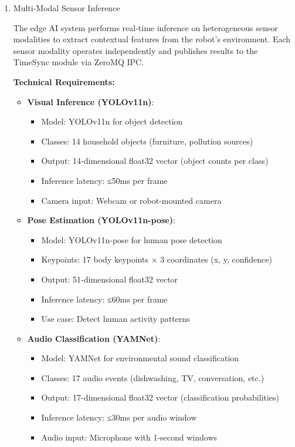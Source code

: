 \documentclass[conference]{IEEEtran}
\begin{document}
\begin{enumerate}
    \item[1.] Multi-Modal Sensor Inference

The edge AI system performs real-time inference on heterogeneous sensor modalities to extract contextual features from the robot's environment. Each sensor modality operates independently and publishes results to the TimeSync module via ZeroMQ IPC.

\textbf{Technical Requirements:}
\begin{itemize}
    \item \textbf{Visual Inference (YOLOv11n)}:
    \begin{itemize}
        \item Model: YOLOv11n for object detection
        \item Classes: 14 household objects (furniture, pollution sources)
        \item Output: 14-dimensional float32 vector (object counts per class)
        \item Inference latency: ≤50ms per frame
        \item Camera input: Webcam or robot-mounted camera
    \end{itemize}
    \item \textbf{Pose Estimation (YOLOv11n-pose)}:
    \begin{itemize}
        \item Model: YOLOv11n-pose for human pose detection
        \item Keypoints: 17 body keypoints × 3 coordinates (x, y, confidence)
        \item Output: 51-dimensional float32 vector
        \item Inference latency: ≤60ms per frame
        \item Use case: Detect human activity patterns
    \end{itemize}
    \item \textbf{Audio Classification (YAMNet)}:
    \begin{itemize}
        \item Model: YAMNet for environmental sound classification
        \item Classes: 17 audio events (dishwashing, TV, conversation, etc.)
        \item Output: 17-dimensional float32 vector (classification probabilities)
        \item Inference latency: ≤30ms per audio window
        \item Audio input: Microphone with 1-second windows

\end{itemize}
\end{itemize}
\end{enumerate}
\end{document}
